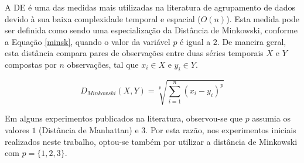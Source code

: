 
A \ac{DE} é uma das medidas mais utilizadas na literatura de agrupamento de dados devido à sua baixa complexidade temporal e espacial ($O(n)$). Esta medida pode ser definida como sendo uma especialização da Distância de Minkowski, conforme a Equação \ref{minsk}, quando o valor da variável $p$ é igual a $2$. De maneira geral, esta distância compara pares de observações entre duas séries temporais $X$ e $Y$ compostas por $n$ observações, tal que $x_i \in X$ e $y_i \in Y$.

\begin{equation}\label{minsk}
D_{Minkowski}(X,Y)=\sqrt[p]{{\sum_{i=1}^{n} ( x_{i}-y_{i})^p}}
\end{equation}

Em alguns experimentos publicados na literatura, observou-se que $p$ assumia os valores $1$ (Distância de Manhattan) e $3$. Por esta razão, nos experimentos iniciais realizados neste trabalho, optou-se também por utilizar a distância de Minkowski com $p = \{1,2,3\}$.



